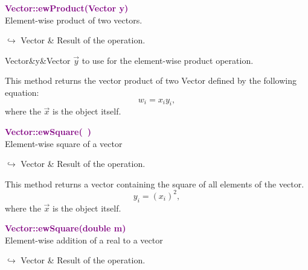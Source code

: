 \textcolor{purple}{\textbf{Vector::ewProduct(Vector y)}}\label{Vector::ewProduct(Vector y)}\\
Element-wise product of two vectors.\vspace*{-0.5em}
\begin{tcolorbox}[grow to left by=-1cm, width=\textwidth-1cm,myArgs,tabularx={l|R}]
$\hookrightarrow$ Vector & Result of the operation.
\end{tcolorbox}

\begin{tcolorbox}[width=\textwidth,myArgs,tabularx={ll|R}]
Vector&y&Vector $\overrightarrow{y}$ to use for the element-wise product operation.
\end{tcolorbox}

This method returns the vector product of two Vector defined by the following equation:
\begin{equation*}
w_i = x_i y_i,
\end{equation*}
where the $\overrightarrow{x}$ is the object itself.

\textcolor{purple}{\textbf{Vector::ewSquare(~)}}\label{Vector::ewSquare()}\\
Element-wise square of a vector\vspace*{-0.5em}
\begin{tcolorbox}[grow to left by=-1cm, width=\textwidth-1cm,myArgs,tabularx={l|R}]
$\hookrightarrow$ Vector & Result of the operation.
\end{tcolorbox}

This method returns a vector containing the square of all elements of the vector.
\begin{equation*}
y_i = (x_i)^2,
\end{equation*}
where the $\overrightarrow{x}$ is the object itself.

\textcolor{purple}{\textbf{Vector::ewSquare(double m)}}\label{Vector::ewSquare(double m)}\\
Element-wise addition of a real to a vector\vspace*{-0.5em}
\begin{tcolorbox}[grow to left by=-1cm, width=\textwidth-1cm,myArgs,tabularx={l|R}]
$\hookrightarrow$ Vector & Result of the operation.
\end{tcolorbox}

